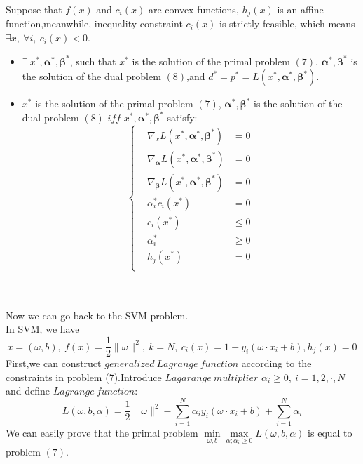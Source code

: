 \begin{theorem}[KKT]
 Suppose that $f(x)$ and $c_{i}(x)$ are convex functions, $h_{j}(x)$ is an affine function,meanwhile, inequality constraint $c_{i}(x)$ is strictly feasible, which means $\exists x,\ \forall i,\ c_{i}(x)<0$.
 \begin{itemize}
   \item $\exists\ x^*,\bm\alpha^*,\bm\beta^*$, such that $x^*$ is the solution of the primal problem $(7)$, $\bm\alpha^*,\bm\beta^*$ is the solution of the dual problem $(8)$,and $d^*=p^*=L(x^*,\bm\alpha^*,\bm\beta^*)$.
   \item $x^*$ is the solution of the primal problem $(7)$, $\bm\alpha^*,\bm\beta^*$ is the solution of the dual problem $(8)$ $iff$ $x^*,\bm\alpha^*,\bm\beta^*$ satisfy:
         \begin{equation}
	     \left\{
	     \begin{split}
	     &\nabla_{x} L(x^*,\bm \alpha^*, \bm \beta^*)&=0\\
         &\nabla_{\bm\alpha} L(x^*,\bm \alpha^*, \bm \beta^*)&=0\\
         &\nabla_{\bm\beta} L(x^*,\bm \alpha^*, \bm \beta^*)&=0\\
	     &\alpha_i^* c_i(x^*)&=0\\
	     & c_i(x^*)&\leq 0\\
	     &\alpha_i^* &\geq 0\\
	     &h_j(x^*) &= 0\\
	     \end{split}
	     \right.
	     \end{equation}
 \end{itemize}
\end{theorem}
\noindent
\\
\\Now we can go back to the SVM problem.
\\In SVM, we have$$x=(\omega,b),\ f(x)=\frac{1}{2}\|\omega\|^{2},\ k=N,\ c_{i}(x)=1-y_{i}(\omega\cdot x_{i}+b),h_{j}(x)=0$$
First,we can construct $generalized\ Lagrange\ function$ according to the constraints in problem (7).Introduce $Lagarange\ multiplier $ $\alpha_{i}\geq 0,\ i=1,2,\cdot,N$ and define $Lagrange\ function$:
\begin{equation}
L(\omega,b,\alpha)=\frac{1}{2}\|\omega\|^2-\sum\limits_{i=1}^{N}\alpha_{i}y_{i}(\omega\cdot x_{i}+b)+\sum\limits_{i=1}^{N}\alpha_{i}
\end{equation}
We can easily prove that the primal problem $\min\limits_{\omega,b}\max\limits_{\alpha;\alpha_{i}\geq 0}L(\omega,b,\alpha)$ is equal to problem $(7)$.
